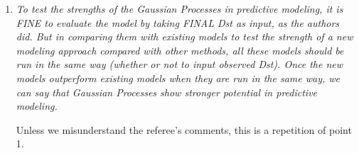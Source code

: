 \documentclass{article}
\begin{document}
\begin{enumerate}
\item \emph{To test the strengths of the Gaussian Processes in predictive modeling, it is FINE to evaluate the model by taking FINAL Dst as input, as the authors did. But in comparing them with existing models to test the strength of a new modeling approach compared with other methods, all these models should be run in the same way (whether or not to input observed Dst). Once the new models outperform existing models when they are run in the same way, we can say that Gaussian Processes show stronger potential in predictive modeling.}

Unless we misunderstand the referee's comments, this is a repetition of point 1. 
\end{enumerate}



\end{document}

